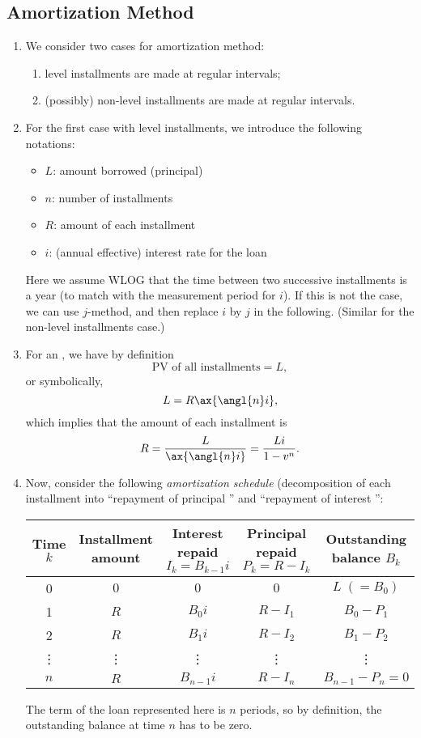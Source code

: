 \subsection{Amortization Method}
\label{subsect:amort-method}
\begin{enumerate}
\item We consider two cases for amortization method:
\begin{enumerate}
\item level installments are made at regular intervals;
\item (possibly) non-level installments are made at regular intervals.
\end{enumerate}
\item \label{it:level-amort-notations}
For the first case with level installments, we introduce the following
notations:
\begin{itemize}
\item \(L\): amount borrowed (principal)
\item \(n\): number of installments
\item \(R\): amount of each installment
\item \(i\): (annual effective) interest rate for the loan
\end{itemize}
Here we assume WLOG that the time between two successive installments is a year
(to match with the measurement period for \(i\)). If this is not the case, we
can use \(j\)-method, and then replace \(i\) by \(j\) in the following.
(Similar for the non-level installments case.)
\item \label{it:amort-loan-def}
For an , we have by definition
\[
\text{PV of all installments}=L,
\]
or symbolically,
\[
L=R\ax{\angl{n}i},
\]
which implies that the amount of each installment is
\[
R=\frac{L}{\ax{\angl{n}i}}=\frac{Li}{1-v^n}.
\]
\item \label{it:amort-schedule}
Now, consider the following \emph{amortization schedule} (decomposition
of each installment into ``repayment of principal '' and
``repayment of interest '':
\begin{center}
\begin{tabular}{ccccc}
\toprule
Time \(k\)&Installment amount&
\makecell{Interest repaid\\ \(I_k=B_{k-1}i\)}&
\makecell{Principal repaid \\ \(P_k=R-I_k\)}&Outstanding balance \(B_k\) \\
\midrule
0&\(0\)&\(0\)&\(0\)&\(L\;(=B_0)\) \\
1&\(R\)&\(B_0i\)&\(R-I_1\)&\(B_0-P_1\) \\
2&\(R\)&\(B_1i\)&\(R-I_2\)&\(B_1-P_2\) \\
\vdots&\vdots&\vdots&\vdots&\vdots\\
\(n\)&\(R\)&\(B_{n-1}i\)&\(R-I_{n}\)&\(B_{n-1}-P_n=0\)\\
\bottomrule
\end{tabular}
\end{center}
\begin{note}
The term of the loan represented here is \(n\) periods, so by definition, the
outstanding balance at time \(n\) has to be zero.
\end{note}


\end{enumerate}
